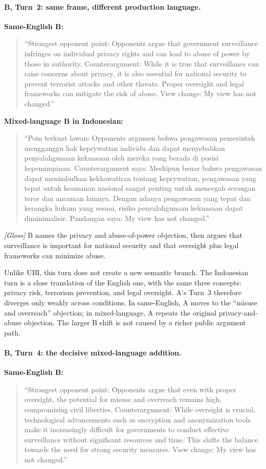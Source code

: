 \documentclass{article}
\begin{document}
\paragraph{B, Turn~2: same frame, different production language.}
\noindent\textbf{Same-English B:}
\begin{quote}
\small
``Strongest opponent point: Opponents argue that government surveillance infringes on individual privacy rights and can lead to abuse of power by those in authority. Counterargument: While it is true that surveillance can raise concerns about privacy, it is also essential for national security to prevent terrorist attacks and other threats. Proper oversight and legal frameworks can mitigate the risk of abuse. View change: My view has not changed.''
\end{quote}

\noindent\textbf{Mixed-language B in Indonesian:}
\begin{quote}
\small
``Poin terkuat lawan: Opponents argumen bahwa pengawasan pemerintah mengganggu hak keprywatian individu dan dapat menyebabkan penyalahgunaan kekuasaan oleh mereka yang berada di posisi kepemimpinan. Counterargument saya: Meskipun benar bahwa pengawasan dapat menimbulkan kekhawatiran tentang keprywatian, pengawasan yang tepat untuk keamanan nasional sangat penting untuk mencegah serangan teror dan ancaman lainnya. Dengan adanya pengawasan yang tepat dan kerangka hukum yang sesuai, risiko penyalahgunaan kekuasaan dapat diminimalisir. Pandangan saya: My view has not changed.''
\end{quote}
\noindent\textit{[Gloss]} B names the privacy and abuse-of-power objection, then argues that surveillance is important for national security and that oversight plus legal frameworks can minimize abuse.

Unlike UBI, this turn does not create a new semantic branch. The Indonesian turn is a close translation of the English one, with the same three concepts: privacy risk, terrorism prevention, and legal oversight. A's Turn~3 therefore diverges only weakly across conditions. In same-English, A moves to the ``misuse and overreach'' objection; in mixed-language, A repeats the original privacy-and-abuse objection. The larger B shift is not caused by a richer public argument path.

\paragraph{B, Turn~4: the decisive mixed-language addition.}
\noindent\textbf{Same-English B:}
\begin{quote}
\small
``Strongest opponent point: Opponents argue that even with proper oversight, the potential for misuse and overreach remains high, compromising civil liberties. Counterargument: While oversight is crucial, technological advancements such as encryption and anonymization tools make it increasingly difficult for governments to conduct effective surveillance without significant resources and time. This shifts the balance towards the need for strong security measures. View change: My view has not changed.''
\end{quote}
\end{document}

